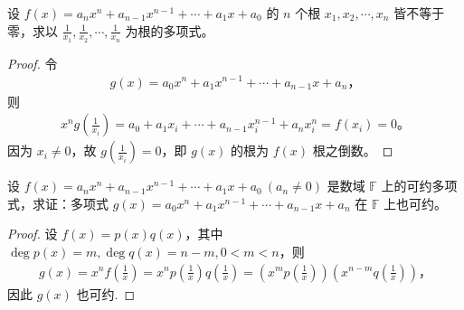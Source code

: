 \documentclass[../../main.tex]{subfiles}%
\begin{document}
\begin{example}
设 $f(x) = a_n x^n + a_{n-1} x^{n-1} + \cdots + a_1 x + a_0$ 的 $n$ 个根 $x_1, x_2, \cdots, x_n$ 皆不等于零，求以 $\frac{1}{x_1}, \frac{1}{x_2}, \cdots, \frac{1}{x_n}$ 为根的多项式。
\end{example}
\begin{proof}
令
\begin{align*}
g(x) = a_0 x^n + a_1 x^{n-1} + \cdots + a_{n-1} x + a_n，
\end{align*}
则
\begin{align*}
x^n g\left(\frac{1}{x_i}\right) = a_0 + a_1 x_i + \cdots + a_{n-1} x_i^{n-1} + a_n x_i^n = f(x_i) = 0。
\end{align*}
因为 $x_i \neq 0$，故 $g\left(\frac{1}{x_i}\right) = 0$，即 $g(x)$ 的根为 $f(x)$ 根之倒数。
\end{proof}

\begin{example}
设 $f(x) = a_n x^n + a_{n-1} x^{n-1} + \cdots + a_1 x + a_0 \ (a_n \neq 0)$ 是数域 $\mathbb{F}$ 上的可约多项式，求证：多项式 $g(x) = a_0 x^n + a_1 x^{n-1} + \cdots + a_{n-1} x + a_n$ 在 $\mathbb{F}$ 上也可约。
\end{example}
\begin{proof}
设 $f(x) = p(x) q(x)$，其中 $\deg p(x) = m, \deg q(x) = n - m, 0 < m < n$，则
\begin{align*}
g(x) = x^n f\left(\frac{1}{x}\right) = x^n p\left(\frac{1}{x}\right) q\left(\frac{1}{x}\right) = \left(x^m p\left(\frac{1}{x}\right)\right) \left(x^{n-m} q\left(\frac{1}{x}\right)\right)，
\end{align*}
因此 $g(x)$ 也可约.
\end{proof}
\end{document}
